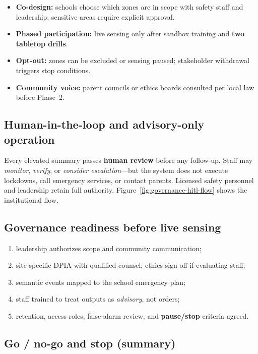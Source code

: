 \begin{itemize}[noitemsep]
  \item \textbf{Co-design:} schools choose which zones are in scope with safety staff and leadership;
        sensitive areas require explicit approval.
  \item \textbf{Phased participation:} live sensing only after sandbox training and \textbf{two tabletop drills}.
  \item \textbf{Opt-out:} zones can be excluded or sensing paused; stakeholder withdrawal triggers stop conditions.
  \item \textbf{Community voice:} parent councils or ethics boards consulted per local law before Phase~2.
\end{itemize}

\subsection{Human-in-the-loop and advisory-only operation}

Every elevated summary passes \textbf{human review} before any follow-up.
Staff may \emph{monitor}, \emph{verify}, or \emph{consider escalation}---but the system does not
execute lockdowns, call emergency services, or contact parents.
Licensed safety personnel and leadership retain full authority.
Figure~\ref{fig:governance-hitl-flow} shows the institutional flow.

\subsection{Governance readiness before live sensing}

\begin{enumerate}[noitemsep]
  \item leadership authorizes scope and community communication;
  \item site-specific DPIA with qualified counsel; ethics sign-off if evaluating staff;
  \item semantic events mapped to the school emergency plan;
  \item staff trained to treat outputs as \emph{advisory}, not orders;
  \item retention, access roles, false-alarm review, and \textbf{pause/stop} criteria agreed.
\end{enumerate}

\subsection{Go / no-go and stop (summary)}

